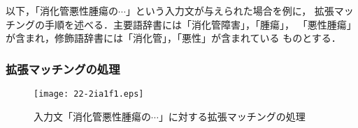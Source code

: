 \documentclass[japanese]{jnlp_1.4}
\begin{document}
以下，「消化管悪性腫瘍の$\cdots$」という入力文が与えられた場合を例に，
拡張マッチングの手順を述べる．主要語辞書には「消化管障害」，「腫瘍」，
「悪性腫瘍」が含まれ，修飾語辞書には「消化管」，「悪性」が含まれている
ものとする．


\subsubsection*{拡張マッチングの処理}

\begin{figure}[t]
\begin{center}
\texttt{[image: 22-2ia1f1.eps]}
\end{center}
\caption{入力文「消化管悪性腫瘍の$\cdots$」に対する拡張マッチングの処理} \label{fig:twodic_matcing}
\end{figure}
\end{document}

